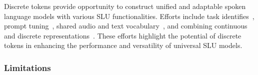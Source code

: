 Discrete tokens provide opportunity to construct unified and adaptable spoken language models with various SLU functionalities.
Efforts include task identifies~\cite{wang2024viola}, prompt tuning~\cite{chang2022speechprompt, chang2023speechprompt, 10.1109/TASLP.2024.3436618,wu2023speechgen}, shared audio and text  vocabulary~\cite{rubenstein2023audiopalm}, and combining continuous and discrete representations~\cite{chen2023lauragpt}.
These efforts highlight the potential of discrete tokens in enhancing the performance and versatility of universal SLU models.

\subsubsection{Limitations}

